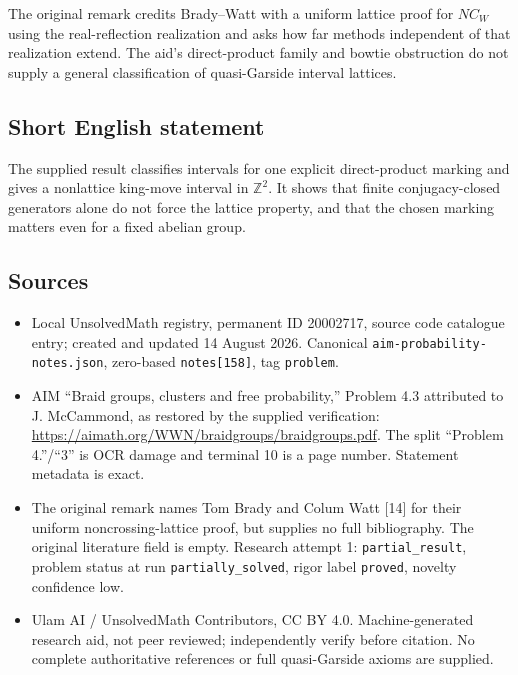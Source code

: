 \documentclass[11pt]{article}
\newcommand{\Z}{\mathbb{Z}}
\begin{document}
The original remark credits Brady--Watt with a uniform lattice proof for $NC_W$ using the real-reflection realization and asks how far methods independent of that realization extend. The aid's direct-product family and bowtie obstruction do not supply a general classification of quasi-Garside interval lattices.
\subsection{Short English statement}
The supplied result classifies intervals for one explicit direct-product marking and gives a nonlattice king-move interval in $\Z^2$. It shows that finite conjugacy-closed generators alone do not force the lattice property, and that the chosen marking matters even for a fixed abelian group.
\subsection{Sources}
\begin{itemize}
\item Local UnsolvedMath registry, permanent ID 20002717, source code catalogue entry; created and updated 14 August 2026. Canonical \texttt{aim-probability-notes.json}, zero-based \texttt{notes[158]}, tag \texttt{problem}.
\item AIM ``Braid groups, clusters and free probability,'' Problem 4.3 attributed to J. McCammond, as restored by the supplied verification: \url{https://aimath.org/WWN/braidgroups/braidgroups.pdf}. The split ``Problem 4.''/``3'' is OCR damage and terminal 10 is a page number. Statement metadata is exact.
\item The original remark names Tom Brady and Colum Watt [14] for their uniform noncrossing-lattice proof, but supplies no full bibliography. The original literature field is empty. Research attempt 1: \texttt{partial\_result}, problem status at run \texttt{partially\_solved}, rigor label \texttt{proved}, novelty confidence low.
\item Ulam AI / UnsolvedMath Contributors, CC BY 4.0. Machine-generated research aid, not peer reviewed; independently verify before citation. No complete authoritative references or full quasi-Garside axioms are supplied.
\end{itemize}
\end{document}
